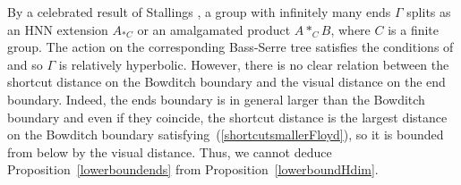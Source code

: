 \documentclass{amsart}
\theoremstyle{definition}
\theoremstyle{remark}
\begin{document}
By a celebrated result of Stallings \cite{Stallings}, a group with infinitely many ends $\Gamma$ splits as an HNN extension $A_{*C}$ or an amalgamated product $A*_{C}B$, where $C$ is a finite group.
The action on the corresponding Bass-Serre tree satisfies the conditions of \cite[Definition~2]{Bowditch} and so $\Gamma$ is relatively hyperbolic.
However, there is no clear relation between the shortcut distance on the Bowditch boundary and the visual distance on the end boundary.
Indeed, the ends boundary is in general larger than the Bowditch boundary and even if they coincide, the shortcut distance is the largest distance on the Bowditch boundary satisfying~(\ref{shortcutsmallerFloyd}), so it is bounded from below by the visual distance.
Thus, we cannot deduce Proposition~\ref{lowerboundends} from Proposition~\ref{lowerboundHdim}.
\end{document}
